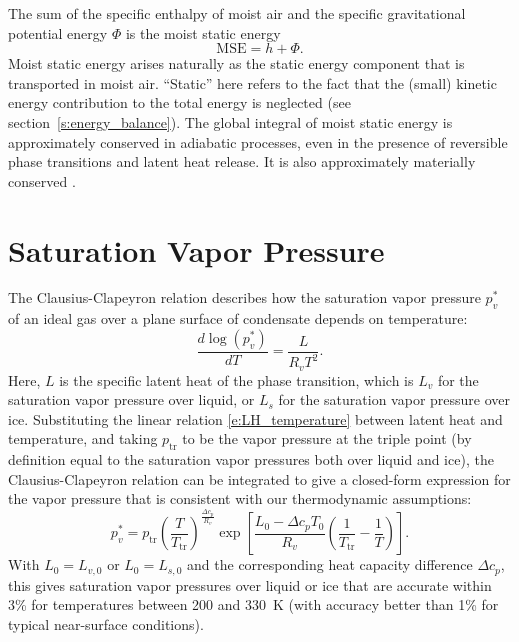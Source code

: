 \documentclass{report}
\begin{document}
The sum of the specific enthalpy of moist air and the specific gravitational potential energy $\Phi$ is the moist static energy \citep{Neelin87a}
\begin{equation}\label{e:MSE}
\mathrm{MSE} = h + \Phi.
\end{equation}
Moist static energy arises naturally as the static energy component that is transported in moist air. ``Static'' here refers to the fact that the (small) kinetic energy contribution to the total energy is neglected (see section~\ref{s:energy_balance}). The global integral of moist static energy is approximately conserved in adiabatic processes, even in the presence of reversible phase transitions and latent heat release. It is also approximately materially conserved \citep{Romps15b}. 

\section{Saturation Vapor Pressure}

The Clausius-Clapeyron relation describes how the saturation vapor pressure $p_v^*$ of an ideal gas over a plane surface of condensate depends on temperature:
\begin{equation}\label{e:Clausius_Clapeyron}
    \frac{d \log(p_v^*)}{dT} = \frac{L}{R_v T^2}.
\end{equation}
Here, $L$ is the specific latent heat of the phase transition, which is $L_v$ for the saturation vapor pressure over liquid, or $L_s$ for the saturation vapor pressure over ice. Substituting the linear relation \eqref{e:LH_temperature} between latent heat and temperature, and taking $p_\mathrm{tr}$ to be the vapor pressure at the triple point (by definition equal to the saturation vapor pressures both over liquid and ice), the Clausius-Clapeyron relation can be integrated to give a closed-form expression for the vapor pressure that is consistent with our thermodynamic assumptions:
\begin{equation}
    p_v^* = p_{\mathrm{tr}} \left( \frac{T}{T_{\mathrm{tr}}} \right)^{\frac{\Delta c_p}{R_v}}
        \exp \left[ \frac{L_0 - \Delta c_p T_0}{R_v} 
        \left( \frac{1}{T_{\mathrm{tr}}} - \frac{1}{T} \right) \right].
        \label{e:sat_vapor_pressure}
\end{equation}
With $L_0 = L_{v,0}$ or $L_0 = L_{s,0}$ and the corresponding heat capacity difference $\Delta c_p$, this gives saturation vapor pressures over liquid or ice that are accurate within 3\% for temperatures between 200 and 330~K (with accuracy better than 1\% for typical near-surface conditions).
\end{document}
